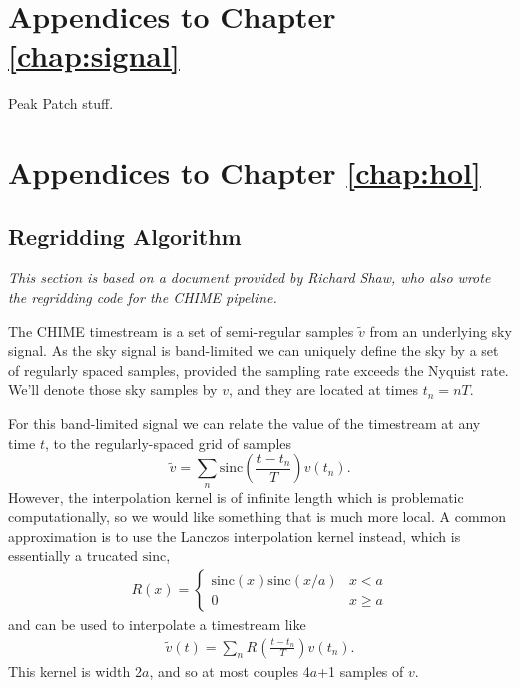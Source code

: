 \appendix

\chapter{Appendices to Chapter \ref{chap:signal}}

Peak Patch stuff.

\chapter{Appendices to Chapter \ref{chap:hol}}

\section{Regridding Algorithm}
\label{app:hol:sec:regrid}

\textit{This section is based on a document provided by Richard Shaw, who also wrote the regridding code for the CHIME pipeline.}

The CHIME timestream is a set of semi-regular samples $\tilde{v}$ from an underlying sky
signal. As the sky signal is band-limited we can uniquely define the sky by a set of
regularly spaced samples, provided the sampling rate exceeds the Nyquist rate. We'll denote those sky samples by $v$, and they are located at times $t_n = n T$.

For this band-limited signal we can relate the value of the timestream at any time $t$, to the regularly-spaced grid of samples
\begin{equation}
\tilde{v} = \sum_n \mathrm{sinc}\left(\frac{t - t_n}{T}\right)v(t_n).
\end{equation}
However, the interpolation kernel is of infinite length which is problematic computationally,
so we would like something that is much more local. A common approximation
is to use the Lanczos interpolation kernel instead, which is essentially a trucated $\mathrm{sinc}$,
\begin{align}
R(x) = \begin{cases}
\mathrm{sinc}(x)\mathrm{sinc}(x/a) & x<a \\
0 & x \geq a
\end{cases}
\end{align}
and can be used to interpolate a timestream like
\begin{align}
\tilde{v}(t) = \sum_n R\left( \frac{t - t_n}{T}\right) v(t_n).
\end{align}
This kernel is width 2$a$, and so at most couples 4$a$+1 samples of $v$.

